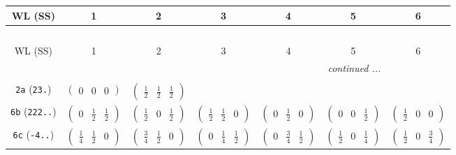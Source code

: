 \documentclass[fleqn,9pt,landscape]{jsarticle}
\begin{document}
\begin{center}
\renewcommand{\arraystretch}{1.2}
\begin{longtable}{ccccccc}
 \hline \hline
WL (SS) & 1 & 2 & 3 & 4 & 5 & 6 \\ \hline \endfirsthead

\multicolumn{6}{l}{\tablename\ \thetable{}} \\
 \hline \hline
WL (SS) & 1 & 2 & 3 & 4 & 5 & 6 \\ \hline \endhead

 \hline \hline
\multicolumn{6}{r}{\footnotesize\it continued ...} \\ \endfoot

 \hline \hline
\multicolumn{6}{r}{} \\ \endlastfoot

{\tt 2a} ({\tt 23.}) & $ \begin{pmatrix} 0 & 0 & 0 \end{pmatrix} $ & $ \begin{pmatrix} \frac{1}{2} & \frac{1}{2} & \frac{1}{2} \end{pmatrix} $ & $  $ & $  $ & $  $ & $  $ \\ \hline
{\tt 6b} ({\tt 222..}) & $ \begin{pmatrix} 0 & \frac{1}{2} & \frac{1}{2} \end{pmatrix} $ & $ \begin{pmatrix} \frac{1}{2} & 0 & \frac{1}{2} \end{pmatrix} $ & $ \begin{pmatrix} \frac{1}{2} & \frac{1}{2} & 0 \end{pmatrix} $ & $ \begin{pmatrix} 0 & \frac{1}{2} & 0 \end{pmatrix} $ & $ \begin{pmatrix} 0 & 0 & \frac{1}{2} \end{pmatrix} $ & $ \begin{pmatrix} \frac{1}{2} & 0 & 0 \end{pmatrix} $ \\ \hline
{\tt 6c} ({\tt -4..}) & $ \begin{pmatrix} \frac{1}{4} & \frac{1}{2} & 0 \end{pmatrix} $ & $ \begin{pmatrix} \frac{3}{4} & \frac{1}{2} & 0 \end{pmatrix} $ & $ \begin{pmatrix} 0 & \frac{1}{4} & \frac{1}{2} \end{pmatrix} $ & $ \begin{pmatrix} 0 & \frac{3}{4} & \frac{1}{2} \end{pmatrix} $ & $ \begin{pmatrix} \frac{1}{2} & 0 & \frac{1}{4} \end{pmatrix} $ & $ \begin{pmatrix} \frac{1}{2} & 0 & \frac{3}{4} \end{pmatrix} $ \\ \hline

\end{longtable}
\end{center}
\end{document}
